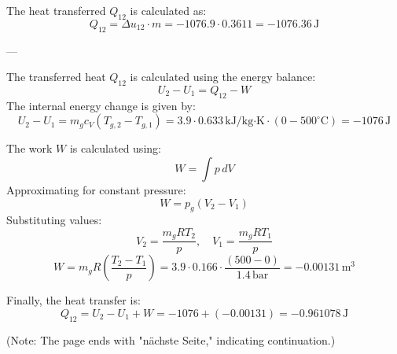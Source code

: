 The heat transferred \( Q_{12} \) is calculated as:  
\[
Q_{12} = \Delta u_{12} \cdot m = -1076.9 \cdot 0.3611 = -1076.36 \, \text{J}
\]

---

The transferred heat \( Q_{12} \) is calculated using the energy balance:  
\[
U_2 - U_1 = Q_{12} - W
\]  
The internal energy change is given by:  
\[
U_2 - U_1 = m_g c_V (T_{g,2} - T_{g,1}) = 3.9 \cdot 0.633 \, \text{kJ/kg·K} \cdot (0 - 500^\circ\text{C}) = -1076 \, \text{J}
\]  

The work \( W \) is calculated using:  
\[
W = \int p \, dV
\]  
Approximating for constant pressure:  
\[
W = p_g (V_2 - V_1)
\]  
Substituting values:  
\[
V_2 = \frac{m_g R T_2}{p}, \quad V_1 = \frac{m_g R T_1}{p}
\]  
\[
W = m_g R \left( \frac{T_2 - T_1}{p} \right) = 3.9 \cdot 0.166 \cdot \frac{(500 - 0)}{1.4 \, \text{bar}} = -0.00131 \, \text{m}^3
\]  

Finally, the heat transfer is:  
\[
Q_{12} = U_2 - U_1 + W = -1076 + (-0.00131) = -0.961078 \, \text{J}
\]  

(Note: The page ends with "nächste Seite," indicating continuation.)